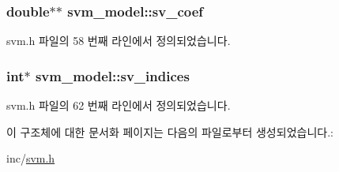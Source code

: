 \hypertarget{structsvm__model_a978084d722ac886100ffcc35fc931143}{
\subsubsection[{sv\+\_\+coef}]{\setlength{\rightskip}{0pt plus 5cm}double$\ast$$\ast$ svm\+\_\+model\+::sv\+\_\+coef}}\label{structsvm__model_a978084d722ac886100ffcc35fc931143}


svm.\+h 파일의 58 번째 라인에서 정의되었습니다.

\hypertarget{structsvm__model_add7f649bf78428c38a282ed8776fa433}{
\subsubsection[{sv\+\_\+indices}]{\setlength{\rightskip}{0pt plus 5cm}int$\ast$ svm\+\_\+model\+::sv\+\_\+indices}}\label{structsvm__model_add7f649bf78428c38a282ed8776fa433}


svm.\+h 파일의 62 번째 라인에서 정의되었습니다.



이 구조체에 대한 문서화 페이지는 다음의 파일로부터 생성되었습니다.\+:\begin{DoxyCompactItemize}
\item 
inc/\hyperlink{svm_8h}{svm.\+h}\end{DoxyCompactItemize}
